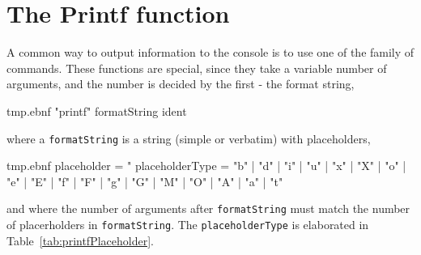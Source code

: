 \section{The Printf function}
\label{sec:printf}
A common way to output information to the console is to use one of the family of  commands. These functions are special, since they take a variable number of arguments, and the number is decided by the first - the format string,
%
\begin{verbatimwrite}{tmp.ebnf}
"printf" formatString {ident}
\end{verbatimwrite}
%
where a \lstinline[language=ebnf]!formatString! is a string (simple or verbatim) with placeholders,
%
\begin{verbatimwrite}{tmp.ebnf}
placeholder = "%
placeholderType = "b" | "d" | "i" | "u" | "x" | "X" | "o" | "e" | "E" | "f" | "F" | "g" | "G" | "M" | "O" | "A" | "a" | "t"
\end{verbatimwrite}
%
and where the number of arguments after \lstinline[language=ebnf]!formatString! must match the number of placerholders in \lstinline[language=ebnf]!formatString!. The \lstinline[language=ebnf]!placeholderType! is elaborated in Table~\ref{tab:printfPlaceholder}.
